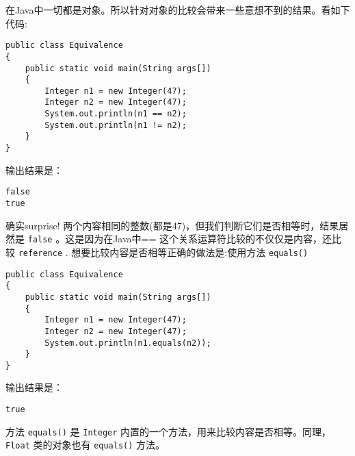\documentclass[10pt,a4paper,UTF8]{article}
\begin{document}
在Java中一切都是对象。所以针对对象的比较会带来一些意想不到的结果。看如下代码:
\lstset{language=java,label= ,caption= ,captionpos=b,firstnumber=1,numbers=left}
\begin{lstlisting}
public class Equivalence
{
    public static void main(String args[])
    {
        Integer n1 = new Integer(47);
        Integer n2 = new Integer(47);
        System.out.println(n1 == n2);
        System.out.println(n1 != n2);
    }
}
\end{lstlisting}
输出结果是：
\begin{verbatim}
false
true
\end{verbatim}
确实surprise! 两个内容相同的整数(都是47)，但我们判断它们是否相等时，结果居然是 \texttt{false} 。这是因为在Java中== 这个关系运算符比较的不仅仅是内容，还比较 \texttt{reference} .  想要比较内容是否相等正确的做法是:使用方法 \texttt{equals()}
\lstset{language=java,label= ,caption= ,captionpos=b,firstnumber=1,numbers=left}
\begin{lstlisting}
public class Equivalence
{
    public static void main(String args[])
    {
        Integer n1 = new Integer(47);
        Integer n2 = new Integer(47);
        System.out.println(n1.equals(n2));
    }
}
\end{lstlisting}
输出结果是：
\begin{verbatim}
true
\end{verbatim}
方法 \texttt{equals()} 是 \texttt{Integer} 内置的一个方法，用来比较内容是否相等。同理， \texttt{Float} 类的对象也有 \texttt{equals()} 方法。
\end{document}
